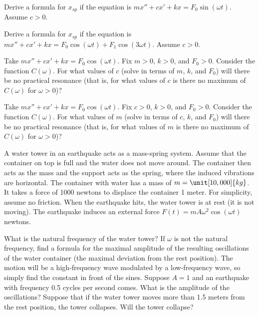\begin{exercise}
Derive a formula for $x_{sp}$ if the equation is
$m x'' + c x' + kx = F_0 \sin (\omega t)$.  Assume $c > 0$.
\end{exercise}

\begin{exercise}
Derive a formula for $x_{sp}$ if the equation is
$m x'' + c x' + kx = F_0 \cos (\omega t) + F_1 \cos (3\omega t)$.
Assume $c > 0$.
\end{exercise}

\begin{exercise}
Take $m x'' + c x' + kx = F_0 \cos (\omega t)$.
Fix $m > 0$, $k > 0$, and $F_0 > 0$.  Consider the function $C(\omega)$.
For what values of $c$ (solve in terms of $m$, $k$, and $F_0$) will there be no
practical resonance (that is, for what values of $c$ is there no maximum of
$C(\omega)$ for $\omega > 0$)?
\end{exercise}

\begin{exercise}
Take $m x'' + c x' + kx = F_0 \cos (\omega t)$.
Fix $c > 0$, $k > 0$, and $F_0 > 0$.  Consider the function $C(\omega)$.
For what values of $m$ (solve in terms of $c$, $k$, and $F_0$) will there be no
practical resonance (that is, for what values of $m$ is there no maximum of
$C(\omega)$ for $\omega > 0$)?
\end{exercise}

\begin{exercise}
\pagebreak[3]
A water tower in an earthquake acts as a mass-spring system.
Assume that the container on top is full and the water does not move around.
The container then acts as the mass and the support acts as the spring, where
the induced vibrations are horizontal.  The container with water
has a mass of $m=\unit[10,000]{kg}$.  It takes a force of 1000 newtons
to displace the container 1 meter.  For simplicity, assume no friction.
When the earthquake hits, the water tower is at rest (it is not moving).
%
The earthquake induces an external force 
$F(t) = m A \omega^2 \cos (\omega t)$ newtons.
\begin{tasks}
\task
What is the natural frequency of the water tower?
\task
If $\omega$ is not the natural frequency, find a formula for the maximal
amplitude of the resulting oscillations of the water container (the maximal
deviation from the rest position).  The motion will be a high-frequency wave
modulated by a low-frequency wave, so simply find the constant in front of the
sines.
\task
Suppose $A = 1$ and an earthquake with frequency 0.5 cycles per second
comes.  What is the amplitude of the oscillations?  Suppose that if the water
tower moves more than 1.5 meters from the rest position, the tower collapses.
Will the tower collapse?
\end{tasks}
\end{exercise}


